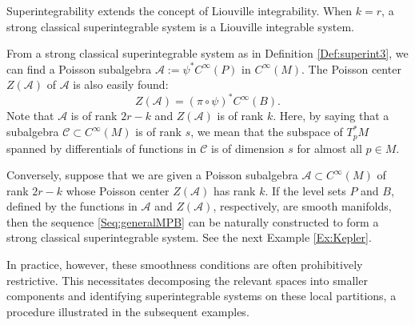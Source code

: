 \documentclass[12pt]{amsart}
\theoremstyle{definition}
\numberwithin{equation}{section}
\newcommand{\Cinf}{C^\infty}
\begin{document}
Superintegrability extends the concept of Liouville integrability. When $k=r$, a  strong classical superintegrable system  is a Liouville integrable system.

 From a strong classical superintegrable system as in Definition \ref{Def:superint3}, we can find a  Poisson subalgebra  $\mathscr{A}:= \psi^* \Cinf(P ) $ in ${C}^\infty(M )$. 
 The Poisson center $Z(\mathscr{A})$ of $\mathscr{A}$ is also easily found:
 $$Z(\mathscr{A})=(\pi\circ \psi)^*\Cinf(B ).
 $$
 Note that $ \mathscr{A} $ is of rank $2r-k$ and $Z(\mathscr{A})$ is of rank $k$. Here, by saying that a subalgebra $\mathscr{C}\subset {C}^\infty(M )$ is of rank $s$, we mean that the subspace of $T^*_p M $ spanned by differentials of functions in $\mathscr{C}$ is   of dimension $s$ for almost all $p\in M$. 
 
 Conversely, suppose that we are given a Poisson subalgebra $\mathcal{A} \subset C^\infty(M )$ of rank $2r-k$ whose Poisson center $Z(\mathcal{A})$ has rank $k$. If the level sets $P $ and $B $, defined by the functions in $\mathcal{A}$ and $Z(\mathcal{A})$, respectively, are smooth manifolds, then the sequence \eqref{Seq:generalMPB} can be naturally constructed to form a strong classical superintegrable system. See the next Example \ref{Ex:Kepler}.
 
 
 In practice, however, these smoothness conditions are often prohibitively restrictive. This necessitates decomposing the relevant spaces into smaller components and identifying superintegrable systems on these local partitions, a procedure illustrated in the subsequent examples.
\end{document}
